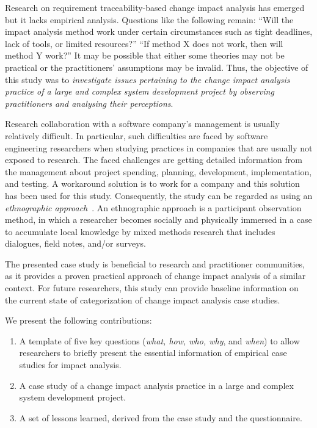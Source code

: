 \documentclass[conference]{IEEEtran}
\begin{document}
Research on requirement traceability-based change impact analysis has
emerged~\cite{ibrahim2005requirements} but it lacks empirical
analysis. Questions like the following remain: ``Will the impact
analysis method work under certain circumstances such as tight
deadlines, lack of tools, or limited resources?'' ``If method X does
not work, then will method Y work?'' It may be possible that either
some theories may not be practical or the practitioners' assumptions
may be invalid. Thus, the objective of this study was to
\textit{investigate issues pertaining to the change impact analysis
  practice of a large and complex system development project by
  observing practitioners and analysing their perceptions}.

Research collaboration with a software company's management is usually
relatively difficult.  In particular, such difficulties are faced by
software engineering researchers when studying practices in companies
that are usually not exposed to research. The faced challenges are
getting detailed information from the management about project
spending, planning, development, implementation, and testing. A
workaround solution is to work for a company and this solution has
been used for this study. Consequently, the study can be regarded as
using an \emph{ethnographic
  approach}~\cite{viller2000ethnographically}. An ethnographic
approach is a participant observation method, in which a researcher
becomes socially and physically immersed in a case to accumulate local
knowledge by mixed methods research that includes dialogues, field
notes, and/or surveys.

The presented case study is beneficial to research and practitioner
communities, as it provides a proven practical approach of change
impact analysis of a similar context. For future researchers,
this study can provide baseline information on the current state of
categorization of change impact analysis case studies.

We present the following contributions:

\begin{enumerate}
\item A template of five key questions (\textit{what, how, who, why},
  and \textit{when}) to allow researchers to briefly present the
  essential information of empirical case studies for impact analysis.
\item A case study of a change impact analysis practice in a large and
  complex system development project.
\item A set of lessons learned, derived from the case study and the
  questionnaire.
\end{enumerate}
\end{document}
